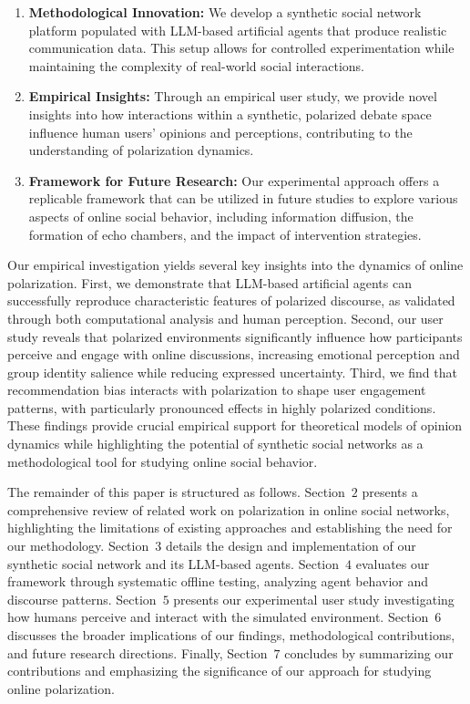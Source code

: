 \begin{enumerate} 

\item \textbf{Methodological Innovation:} We develop a synthetic social network platform populated with LLM-based artificial agents that produce realistic communication data. This setup allows for controlled experimentation while maintaining the complexity of real-world social interactions.

\item \textbf{Empirical Insights:} Through an empirical user study, we provide novel insights into how interactions within a synthetic, polarized debate space influence human users' opinions and perceptions, contributing to the understanding of polarization dynamics.

\item \textbf{Framework for Future Research:} Our experimental approach offers a replicable framework that can be utilized in future studies to explore various aspects of online social behavior, including information diffusion, the formation of echo chambers, and the impact of intervention strategies.

\end{enumerate}

Our empirical investigation yields several key insights into the dynamics of online polarization. First, we demonstrate that LLM-based artificial agents can successfully reproduce characteristic features of polarized discourse, as validated through both computational analysis and human perception. Second, our user study reveals that polarized environments significantly influence how participants perceive and engage with online discussions, increasing emotional perception and group identity salience while reducing expressed uncertainty. Third, we find that recommendation bias interacts with polarization to shape user engagement patterns, with particularly pronounced effects in highly polarized conditions. These findings provide crucial empirical support for theoretical models of opinion dynamics while highlighting the potential of synthetic social networks as a methodological tool for studying online social behavior.

The remainder of this paper is structured as follows. Section~$2$ presents a comprehensive review of related work on polarization in online social networks, highlighting the limitations of existing approaches and establishing the need for our methodology. Section~$3$ details the design and implementation of our synthetic social network and its LLM-based agents. Section~$4$ evaluates our framework through systematic offline testing, analyzing agent behavior and discourse patterns. Section~$5$ presents our experimental user study investigating how humans perceive and interact with the simulated environment. Section~$6$ discusses the broader implications of our findings, methodological contributions, and future research directions. Finally, Section~$7$ concludes by summarizing our contributions and emphasizing the significance of our approach for studying online polarization.

